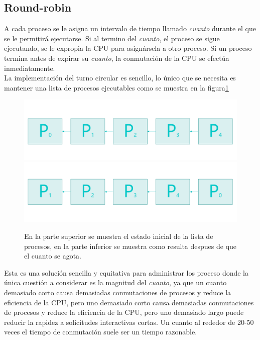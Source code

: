 \documentclass[12pt]{article}
\begin{document}
\subsection{Round-robin}
A cada proceso se le asigna un intervalo de tiempo llamado \emph{cuanto} durante el que se le permitirá ejecutarse. Si al termino del \emph{cuanto}, el proceso se sigue ejecutando, se le expropia la CPU para asignársela a otro proceso. Si un proceso termina antes de expirar su \emph{cuanto}, la conmutación de la CPU se efectúa inmediatamente.\\
La implementación del turno circular es sencillo, lo único que se necesita es mantener una lista de procesos ejecutables como se muestra en la figura\ref{fig:listas}
\begin{figure}
    \includegraphics[width=\textwidth]{r-r-0.png}
    \includegraphics[width=\textwidth]{r-r-1.png}
    \caption{En la parte superior se muestra el estado inicial de la lista de procesos, en la parte inferior se muestra como resulta despues de que el cuanto se agota.}
    \label{fig:listas}
\end{figure}
 Esta es una solución sencilla y equitativa para administrar los proceso donde la única cuestión a considerar es la magnitud del \emph{cuanto}, ya que un cuanto demasiado corto causa demasiadas conmutaciones de procesos y reduce la eficiencia de la CPU, pero uno demasiado corto causa demasiadas conmutaciones de procesos y reduce la eficiencia de la CPU, pero uno demasiado largo puede reducir la rapidez a solicitudes interactivas cortas. Un cuanto al rededor de 20-50 veces el tiempo de conmutación suele ser un tiempo razonable.
\end{document}
